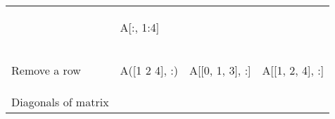 \documentclass[10pt, landscape]{article}
\newenvironment{Shaded}{}{}
\newcommand{\DecValTok}[1]{\textcolor[rgb]{0.25,0.63,0.44}{{#1}}}
\newcommand{\FloatTok}[1]{\textcolor[rgb]{0.25,0.63,0.44}{{#1}}}
\newcommand{\NormalTok}[1]{{#1}}
\begin{document}
\begin{multicols*}{2}
\begin{table}[ht]
\begin{tabular}[ ]{@{}llll@{}}
\begin{minipage}[t]{0.23\columnwidth}
\begin{Shaded}
\end{Shaded}
\strut
\end{minipage} & \begin{minipage}[t]{0.20\columnwidth}\raggedright\strut
\begin{Shaded}
\begin{Highlighting}[]
\NormalTok{A[:, }\FloatTok{1}\NormalTok{:}\FloatTok{4}\NormalTok{]}
\end{Highlighting}
\end{Shaded}
\strut
\end{minipage}\tabularnewline
\begin{minipage}[t]{0.23\columnwidth}\raggedright\strut
Remove a row\strut
\end{minipage} & \begin{minipage}[t]{0.23\columnwidth}\raggedright\strut
\begin{Shaded}
\begin{Highlighting}[]
\NormalTok{A([}\FloatTok{1} \FloatTok{2} \FloatTok{4}\NormalTok{], :)}
\end{Highlighting}
\end{Shaded}
\strut
\end{minipage} & \begin{minipage}[t]{0.23\columnwidth}\raggedright\strut
\begin{Shaded}
\begin{Highlighting}[]
\NormalTok{A[[}\DecValTok{0}\NormalTok{, }\DecValTok{1}\NormalTok{, }\DecValTok{3}\NormalTok{], :]}
\end{Highlighting}
\end{Shaded}
\strut
\end{minipage} & \begin{minipage}[t]{0.20\columnwidth}\raggedright\strut
\begin{Shaded}
\begin{Highlighting}[]
\NormalTok{A[[}\FloatTok{1}\NormalTok{, }\FloatTok{2}\NormalTok{, }\FloatTok{4}\NormalTok{], :]}
\end{Highlighting}
\end{Shaded}
\strut
\end{minipage}\tabularnewline
\begin{minipage}[t]{0.23\columnwidth}\raggedright\strut
Diagonals of matrix\strut
\end{minipage} & \begin{minipage}[t]{0.23\columnwidth}\raggedright\strut
\begin{Shaded}
\begin{Highlighting}[]

\end{Highlighting}
\end{Shaded}
\end{minipage}
\end{tabular}
\end{table}
\end{multicols*}
\end{document}
